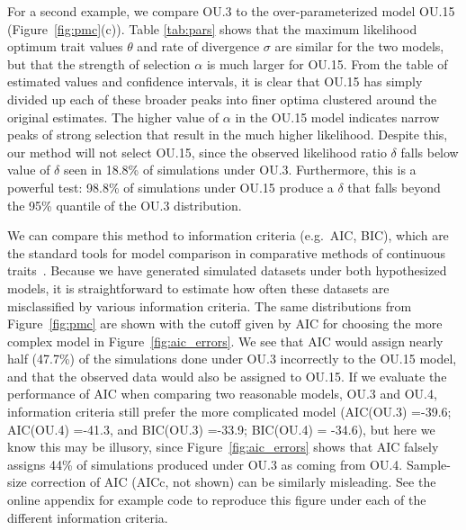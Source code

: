 For a second example, we compare OU.3 to the over-parameterized model OU.15 (Figure~\ref{fig:pmc}(c)).
Table \ref{tab:pars} shows that the maximum likelihood optimum trait values $\theta$ and rate of divergence $\sigma$ are similar for the two models,
but that the strength of selection $\alpha$ is much larger for OU.15.
From the table of estimated values and confidence intervals, 
it is clear that OU.15 has simply divided up each of these broader peaks into finer optima clustered around the original estimates.  
The higher value of $\alpha$ in the OU.15 model indicates narrow peaks of strong selection that result in the much higher likelihood.  
Despite this, our method will not select OU.15,
since the observed likelihood ratio $\delta$ falls below value of $\delta$ seen in 18.8\% of simulations under OU.3.
Furthermore, this is a powerful test:
98.8\% of simulations under OU.15 produce a $\delta$ that falls beyond the 95\% quantile of the OU.3 distribution. 

We can compare this method to 
information criteria (e.g.\ AIC, BIC), 
which are the standard tools for model comparison in comparative methods of continuous traits~\citep{Butler2004}.  
Because we have generated simulated datasets under both hypothesized models, 
it is straightforward to estimate how often these datasets
are misclassified by various information criteria. 
The same distributions from Figure~\ref{fig:pmc} are shown 
with the cutoff given by AIC for choosing the more complex model in Figure~\ref{fig:aic_errors}.
We see that AIC would assign nearly half (47.7\%) of the simulations done under OU.3 incorrectly to the OU.15 model,
and that the observed data would also be assigned to OU.15.
If we evaluate the performance of AIC when comparing two reasonable models, OU.3 and OU.4,
information criteria still prefer the more complicated model
(AIC(OU.3) =-39.6; AIC(OU.4) =-41.3, and BIC(OU.3) =-33.9; BIC(OU.4) = -34.6),
but here we know this may be illusory, since
Figure~\ref{fig:aic_errors} shows that AIC falsely assigns 44\% of simulations produced under OU.3 as coming from OU.4.
Sample-size correction of AIC (AICc, not shown) can be similarly misleading.  
See the online appendix for example code to reproduce this figure under each of the different information criteria.  


